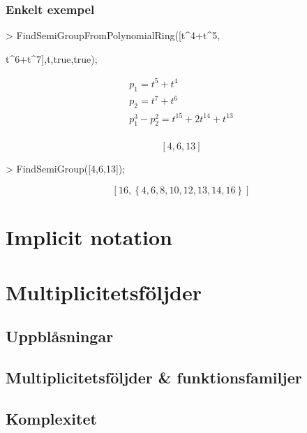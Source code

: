 \documentclass{beamer}
\begin{document}
\begin{frame}
	\frametitle{Enkelt exempel}
	
	\begin{example}
		\begin{semiverbatim}
			> FindSemiGroupFromPolynomialRing([t\^{}4+t\^{}5,

\qquad t\^{}6+t\^{}7],t,true,true);
		\end{semiverbatim}
\[\begin{array}{c}
p_1 = t^5 + t^4\\[3pt]
p_2 = t^7 + t^6\\[3pt]
p_1^3 - p_2^2 = t^{15} + 2 t^{14} + t^{13}\\
\end{array}\]

\[\left[4, 6, 13\right]\]

\begin{semiverbatim}
> FindSemiGroup([4,6,13]);
\end{semiverbatim}
\[\left[16, \left\{4, 6, 8, 10, 12, 13, 14, 16\right\}\right]\]
	\end{example}
\end{frame}



\begin{frame}
	\frametitle{}
\end{frame}
\begin{frame}
	\frametitle{}
\end{frame}
\begin{frame}
	\frametitle{}
\end{frame}



\section{Implicit notation}

\section{Multiplicitetsföljder}
\subsection{Uppblåsningar}
\subsection{Multiplicitetsföljder \& funktionsfamiljer}
\subsection{Komplexitet}
\end{document}
